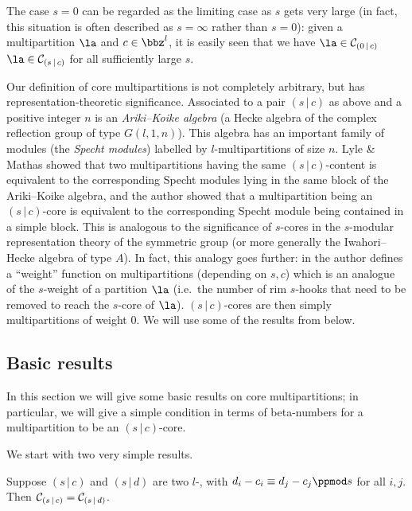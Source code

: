 \documentclass[a4paper, 11pt, twoside]{article}
\begin{document}
\begin{rmksenum}
The case $s=0$ can be regarded as the limiting case as $s$ gets very large (in fact, this situation is often described as $s=\infty$ rather than $s=0$): given a multipartition $\la$ and $c\in\bbz^l$, it is easily seen that we have $\la\in\mc0c$ \iff $\la\in\mc sc$ for all sufficiently large $s$.
\item
Our definition of core multipartitions is not completely arbitrary, but has representation-theoretic significance. Associated to a pair $(s\,|\,c)$ as above and a positive integer $n$ is an \emph{Ariki--Koike algebra} (a Hecke algebra of the complex reflection group of type $G(l,1,n)$). This algebra has an important family of modules (the \emph{Specht modules}) labelled by $l$-multi\-partitions of size $n$. Lyle \& Mathas \cite{lyma} showed that two multipartitions having the same $(s\,|\,c)$-content is equivalent to the corresponding Specht modules lying in the same block of the Ariki--Koike algebra, and the author \cite{mfwt} showed that a multipartition being an $(s\,|\,c)$-core is equivalent to the corresponding Specht module being contained in a simple block. This is analogous to the significance of $s$-cores in the $s$-modular representation theory of the symmetric group (or more generally the Iwahori--Hecke algebra of type $A$). In fact, this analogy goes further: in \cite{mfwt} the author defines a ``weight'' function on multipartitions (depending on $s,c$) which is an analogue of the $s$-weight of a partition $\la$  (i.e.\ the number of rim $s$-hooks that need to be removed to reach the $s$-core of $\la$). $(s\,|\,c)$-cores are then simply multipartitions of weight $0$. We will use some of the results from \cite{mfwt} below.
\end{rmksenum}

\subsection{Basic results}\label{basicmcoresec}

In this section we will give some basic results on core multipartitions; in particular, we will give a simple condition in terms of beta-numbers for a multipartition to be an $(s\,|\,c)$-core.

We start with two very simple results.

\begin{lemma}\label{shiftmods}
Suppose $(s\,|\,c)$ and $(s\,|\,d)$ are two $l$-\mcds, with $d_i-c_i\equiv d_j-c_j\ppmod s$ for all $i,j$. Then $\mathcal{C}_{(s\,|\,c)}=\mathcal{C}_{(s\,|\,d)}$.
\end{lemma}
\end{document}
